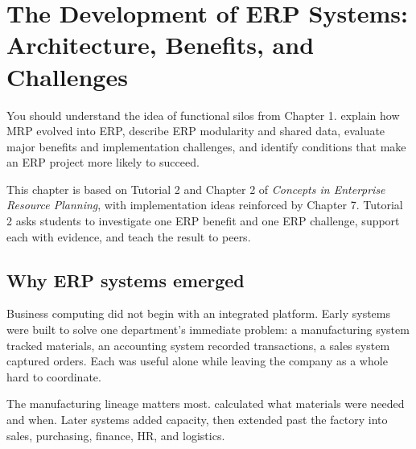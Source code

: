 \chapter{The Development of ERP Systems: Architecture, Benefits, and Challenges}
\label{ch:erp-development}

\chapterguide
  {You should understand the idea of functional silos from Chapter 1.}
  {explain how MRP evolved into ERP, describe ERP modularity and shared data, evaluate major benefits and implementation challenges, and identify conditions that make an ERP project more likely to succeed.}

\begin{sourcebasis}
This chapter is based on Tutorial 2 and Chapter 2 of \emph{Concepts in
Enterprise Resource Planning}, with implementation ideas reinforced by Chapter 7.
Tutorial 2 asks students to investigate one ERP benefit and one ERP challenge,
support each with evidence, and teach the result to peers.
\end{sourcebasis}

\section{Why ERP systems emerged}

Business computing did not begin with an integrated platform. Early systems were
built to solve one department's immediate problem: a manufacturing system
tracked materials, an accounting system recorded transactions, a sales system
captured orders. Each was useful alone while leaving the company as a whole hard
to coordinate.

The manufacturing lineage matters most.  calculated what materials were needed and when. Later systems added
capacity, then extended past the factory into sales, purchasing, finance, HR,
and logistics.

